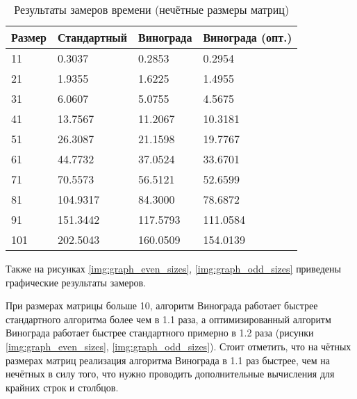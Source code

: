 \begin{table}[h]
    \begin{center}
        \begin{threeparttable}
        \captionsetup{justification=raggedright,singlelinecheck=off}
        \caption{Результаты замеров времени (нечётные размеры матриц)}
        \label{tbl:time_mes_odd}
        \begin{tabular}{|l|l|l|l|}
            \hline
            Размер & Стандартный & Винограда & Винограда (опт.) \\
            \hline
            11 & 0.3037 & 0.2853 & 0.2954 \\
            \hline
            21 & 1.9355 & 1.6225 & 1.4955 \\
            \hline
            31 & 6.0607 & 5.0755 & 4.5675 \\
            \hline
            41 & 13.7567 & 11.2067 & 10.3181 \\
            \hline
            51 & 26.3087 & 21.1598 & 19.7767 \\
            \hline
            61 & 44.7732 & 37.0524 & 33.6701 \\
            \hline
            71 & 70.5573 & 56.5121 & 52.6599 \\
            \hline
            81 & 104.9317 & 84.3000 & 78.6872 \\
            \hline
            91 & 151.3442 & 117.5793 & 111.0584 \\
            \hline
            101 & 202.5043 & 160.0509 & 154.0139 \\
            \hline
		\end{tabular}
    \end{threeparttable}
\end{center}
\end{table}

Также на рисунках \ref{img:graph_even_sizes}, \ref{img:graph_odd_sizes} приведены графические результаты замеров.

\clearpage
При размерах матрицы больше 10, алгоритм Винограда работает быстрее стандартного алгоритма более чем в 1.1 раза, а оптимизированный алгоритм Винограда работает быстрее стандартного примерно в 1.2 раза (рисунки \ref{img:graph_even_sizes}, \ref{img:graph_odd_sizes}).
Стоит отметить, что на чётных размерах матриц реализация алгоритма Винограда в 1.1 раз быстрее, чем на нечётных  в силу того, что нужно проводить дополнительные вычисления для крайних строк и столбцов.



